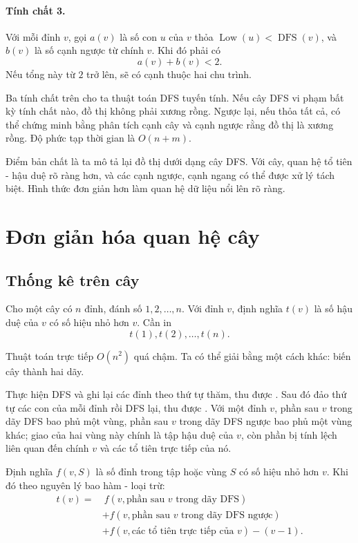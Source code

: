 \documentclass[11pt]{article}
\begin{document}
\paragraph{Tính chất 3.}
Với mỗi đỉnh \(v\), gọi \(a(v)\) là số con \(u\) của \(v\) thỏa
\(\operatorname{Low}(u)<\operatorname{DFS}(v)\), và \(b(v)\) là số cạnh ngược
từ chính \(v\). Khi đó phải có
\[
  a(v)+b(v)<2.
\]
Nếu tổng này từ \(2\) trở lên, sẽ có cạnh thuộc hai chu trình.

Ba tính chất trên cho ta thuật toán DFS tuyến tính. Nếu cây DFS vi phạm bất
kỳ tính chất nào, đồ thị không phải xương rồng. Ngược lại, nếu thỏa tất cả,
có thể chứng minh bằng phân tích cạnh cây và cạnh ngược rằng đồ thị là xương
rồng. Độ phức tạp thời gian là \(O(n+m)\).

Điểm bản chất là ta mô tả lại đồ thị dưới dạng cây DFS. Với cây, quan hệ tổ
tiên - hậu duệ rõ ràng hơn, và các cạnh ngược, cạnh ngang có thể được xử lý
tách biệt. Hình thức đơn giản hơn làm quan hệ dữ liệu nổi lên rõ ràng.

\section{Đơn giản hóa quan hệ cây}

\subsection{Thống kê trên cây}

Cho một cây có \(n\) đỉnh, đánh số \(1,2,\ldots,n\). Với đỉnh \(v\), định
nghĩa \(t(v)\) là số hậu duệ của \(v\) có số hiệu nhỏ hơn \(v\). Cần in
\[
  t(1),t(2),\ldots,t(n).
\]

Thuật toán trực tiếp \(O(n^2)\) quá chậm. Ta có thể giải bằng một cách khác:
biến cây thành hai dãy.

Thực hiện DFS và ghi lại các đỉnh theo thứ tự thăm, thu được .
Sau đó đảo thứ tự các con của mỗi đỉnh rồi DFS lại, thu được . Với một đỉnh \(v\), phần sau \(v\) trong dãy DFS bao phủ một vùng,
phần sau \(v\) trong dãy DFS ngược bao phủ một vùng khác; giao của hai vùng
này chính là tập hậu duệ của \(v\), còn phần bị tính lệch liên quan đến chính
\(v\) và các tổ tiên trực tiếp của nó.

Định nghĩa \(f(v,S)\) là số đỉnh trong tập hoặc vùng \(S\) có số hiệu nhỏ hơn
\(v\). Khi đó theo nguyên lý bao hàm - loại trừ:
\[
\begin{aligned}
t(v)=&\ f(v,\text{phần sau \(v\) trong dãy DFS})\\
&+f(v,\text{phần sau \(v\) trong dãy DFS ngược})\\
&+f(v,\text{các tổ tiên trực tiếp của \(v\)})-(v-1).
\end{aligned}
\]
\end{document}
